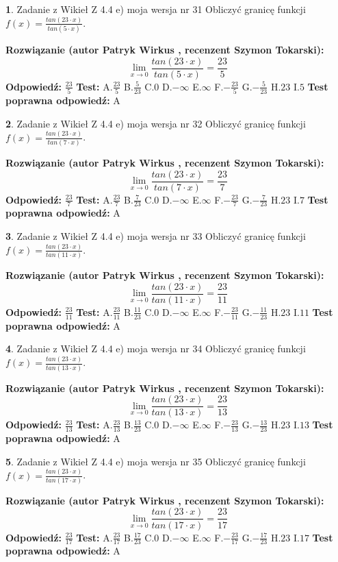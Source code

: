 \documentclass[12pt, a4paper]{article}
\theoremstyle{definition} %
\newtheorem{zad}{}
\newcommand{\zadStart}[1]{\begin{zad}#1\newline}
\newcommand{\zadStop}{\end{zad}}
\newcommand{\rozwStart}[2]{\noindent \textbf{Rozwiązanie (autor #1 , recenzent #2): }\newline}
\newcommand{\rozwStop}{\newline}
\newcommand{\odpStart}{\noindent \textbf{Odpowiedź:}\newline}
\newcommand{\odpStop}{\newline}
\newcommand{\testStart}{\noindent \textbf{Test:}\newline}
\newcommand{\testStop}{\newline}
\newcommand{\kluczStart}{\noindent \textbf{Test poprawna odpowiedź:}\newline}
\newcommand{\kluczStop}{\newline}
\begin{document}
\zadStart{Zadanie z Wikieł Z 4.4 e) moja wersja nr 31}
Obliczyć granicę funkcji $f(x)=\frac{tan(23\cdot x)}{tan(5\cdot x)}$.
\zadStop
\rozwStart{Patryk Wirkus}{Szymon Tokarski}
$$\lim\limits_{x\to 0}\frac{tan(23\cdot x)}{tan(5\cdot x)}=
\frac{23}{5}$$
\rozwStop
\odpStart
$\frac{23}{5}$
\odpStop
\testStart
A.$\frac{23}{5}$
B.$\frac{5}{23}$
C.$0$
D.$-\infty$
E.$\infty$
F.$-\frac{23}{5}$
G.$-\frac{5}{23}$
H.$23$
I.$5$
\testStop
\kluczStart
A
\kluczStop



\zadStart{Zadanie z Wikieł Z 4.4 e) moja wersja nr 32}
Obliczyć granicę funkcji $f(x)=\frac{tan(23\cdot x)}{tan(7\cdot x)}$.
\zadStop
\rozwStart{Patryk Wirkus}{Szymon Tokarski}
$$\lim\limits_{x\to 0}\frac{tan(23\cdot x)}{tan(7\cdot x)}=
\frac{23}{7}$$
\rozwStop
\odpStart
$\frac{23}{7}$
\odpStop
\testStart
A.$\frac{23}{7}$
B.$\frac{7}{23}$
C.$0$
D.$-\infty$
E.$\infty$
F.$-\frac{23}{7}$
G.$-\frac{7}{23}$
H.$23$
I.$7$
\testStop
\kluczStart
A
\kluczStop



\zadStart{Zadanie z Wikieł Z 4.4 e) moja wersja nr 33}
Obliczyć granicę funkcji $f(x)=\frac{tan(23\cdot x)}{tan(11\cdot x)}$.
\zadStop
\rozwStart{Patryk Wirkus}{Szymon Tokarski}
$$\lim\limits_{x\to 0}\frac{tan(23\cdot x)}{tan(11\cdot x)}=
\frac{23}{11}$$
\rozwStop
\odpStart
$\frac{23}{11}$
\odpStop
\testStart
A.$\frac{23}{11}$
B.$\frac{11}{23}$
C.$0$
D.$-\infty$
E.$\infty$
F.$-\frac{23}{11}$
G.$-\frac{11}{23}$
H.$23$
I.$11$
\testStop
\kluczStart
A
\kluczStop



\zadStart{Zadanie z Wikieł Z 4.4 e) moja wersja nr 34}
Obliczyć granicę funkcji $f(x)=\frac{tan(23\cdot x)}{tan(13\cdot x)}$.
\zadStop
\rozwStart{Patryk Wirkus}{Szymon Tokarski}
$$\lim\limits_{x\to 0}\frac{tan(23\cdot x)}{tan(13\cdot x)}=
\frac{23}{13}$$
\rozwStop
\odpStart
$\frac{23}{13}$
\odpStop
\testStart
A.$\frac{23}{13}$
B.$\frac{13}{23}$
C.$0$
D.$-\infty$
E.$\infty$
F.$-\frac{23}{13}$
G.$-\frac{13}{23}$
H.$23$
I.$13$
\testStop
\kluczStart
A
\kluczStop



\zadStart{Zadanie z Wikieł Z 4.4 e) moja wersja nr 35}
Obliczyć granicę funkcji $f(x)=\frac{tan(23\cdot x)}{tan(17\cdot x)}$.
\zadStop
\rozwStart{Patryk Wirkus}{Szymon Tokarski}
$$\lim\limits_{x\to 0}\frac{tan(23\cdot x)}{tan(17\cdot x)}=
\frac{23}{17}$$
\rozwStop
\odpStart
$\frac{23}{17}$
\odpStop
\testStart
A.$\frac{23}{17}$
B.$\frac{17}{23}$
C.$0$
D.$-\infty$
E.$\infty$
F.$-\frac{23}{17}$
G.$-\frac{17}{23}$
H.$23$
I.$17$
\testStop
\kluczStart
A
\kluczStop
\end{document}
